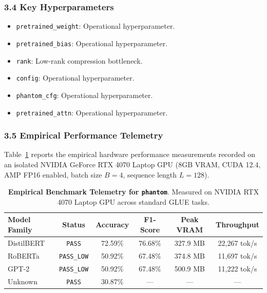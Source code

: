 \subsubsection*{3.4 Key Hyperparameters}
\begin{itemize}
    \item \texttt{pretrained\_weight}: Operational hyperparameter.
    \item \texttt{pretrained\_bias}: Operational hyperparameter.
    \item \texttt{rank}: Low-rank compression bottleneck.
    \item \texttt{config}: Operational hyperparameter.
    \item \texttt{phantom\_cfg}: Operational hyperparameter.
    \item \texttt{pretrained\_attn}: Operational hyperparameter.
\end{itemize}

\subsubsection*{3.5 Empirical Performance Telemetry}
Table~\ref{tab:telemetry_phantom} reports the empirical hardware performance measurements recorded on an isolated NVIDIA GeForce RTX 4070 Laptop GPU (8GB VRAM, CUDA 12.4, AMP FP16 enabled, batch size $B=4$, sequence length $L=128$).

\begin{table}[h]
\centering
\small
\caption{\textbf{Empirical Benchmark Telemetry for \texttt{phantom}}. Measured on NVIDIA RTX 4070 Laptop GPU across standard GLUE tasks.}
\label{tab:telemetry_phantom}
\begin{tabular*}{\columnwidth}{@{\extracolsep{\fill}}lccccc}
\toprule
\textbf{Model Family} & \textbf{Status} & \textbf{Accuracy} & \textbf{F1-Score} & \textbf{Peak VRAM} & \textbf{Throughput} \\
\midrule
DistilBERT & \texttt{PASS} & 72.59\% & 76.68\% & 327.9 MB & 22,267 tok/s \\
RoBERTa & \texttt{PASS\_LOW} & 50.92\% & 67.48\% & 374.8 MB & 11,697 tok/s \\
GPT-2 & \texttt{PASS\_LOW} & 50.92\% & 67.48\% & 500.9 MB & 11,222 tok/s \\
Unknown & \texttt{PASS} & 30.87\% & --- & --- & --- \\
\bottomrule
\end{tabular*}
\end{table}

